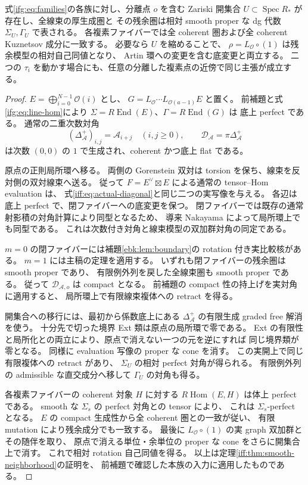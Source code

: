 \begin{theorem}
\label{ifg:thm:smooth-neighborhood}
式\eqref{ifg:eq:families}の各族に対し、分離点 $o$ を含む Zariski 開集合
$U\subset\operatorname{Spec}R_*$ が存在し、全線束の厚生成圏と
その残余圏は相対 smooth proper な dg 代数
$\Sigma_U,\Gamma_U$ で表される。
各複素ファイバーでは全 coherent 圏および全 coherent Kuznetsov 成分に一致する。
必要なら $U$ を縮めることで、
$\rho=L_{\mathcal O}\circ(1)$ は残余模型の相対自己同値となり、
Artin 環への変更を含む底変更と両立する。
二つの $\tau_i$ を動かす場合にも、任意の分離した複素点の近傍で同じ主張が成立する。
\end{theorem}

\begin{proof}
$E=\bigoplus_{i=0}^{N-1}\mathcal O(i)$ とし、
$G=L_{\mathcal O}\cdots L_{\mathcal O(a-1)}E$ と置く。
前補題と式\eqref{ifg:eq:line-hom}により
$\Sigma=R\operatorname{End}(E)$、$\Gamma=R\operatorname{End}(G)$ は
底上 perfect である。
通常の二重次数対角
\[
 (\Delta_{\mathcal A}^{+})_{i,j}=\mathcal A_{i+j}\quad(i,j\ge0),
 \qquad \mathcal D_{\mathcal A}=\pi\Delta_{\mathcal A}^{+}
\]
は次数 $(0,0)$ の $1$ で生成され、coherent かつ底上 flat である。

原点の正則局所環へ移る。
両側の Gorenstein 双対は torsion を保ち、線束を反対側の双対線束へ送る。
従って
$F=E^\vee\boxtimes E$ による通常の tensor--Hom evaluation は、
式\eqref{iff:eq:actual-diagonal}と同じ二つの実写像を与える。
各辺は底上 perfect で、閉ファイバーへの底変更を保つ。
閉ファイバーでは既存の通常射影積の対角計算により同型となるため、
導来 Nakayama によって局所環上でも同型である。
これは次数付き対角と線束模型の双加群対角の同定である。

$m=0$ の閉ファイバーには補題\ref{ebk:lem:boundary}の
rotation 付き実比較核がある。
$m=1$ には主稿の定理を適用する。
いずれも閉ファイバーの残余圏は smooth proper であり、
有限例外列を戻した全線束圏も smooth proper である。
従って $\mathcal D_{\mathcal A,o}$ は compact となる。
前補題の compact 性の持上げを実対角に適用すると、
局所環上で有限線束複体への retract を得る。

開集合への移行には、最初から係数底上にある
$\Delta_{\mathcal A}^{+}$ の有限生成 graded free 解消を使う。
十分先で切った境界 Ext 類は原点の局所環で零である。
Ext の有限性と局所化との両立により、原点で消えない一つの元を逆にすれば
同じ境界類が零となる。
同様に evaluation 写像の proper な cone を消す。
この実開上で同じ有限複体への retract があり、
$\Sigma_U$ の相対 perfect 対角が得られる。
有限例外列の admissible な直交成分へ移して $\Gamma_U$ の対角も得る。

各複素ファイバーの coherent 対象 $H$ に対する
$R\operatorname{Hom}(E,H)$ は体上 perfect である。
smooth な $\Sigma_s$ の perfect 対角との tensor により、
これは $\Sigma_s$-perfect となる。
$E$ の compact 生成性から全 coherent 圏との一致が従い、
有限 mutation により残余成分でも一致する。
最後に $L_{\mathcal O}\circ(1)$ の実 graph 双加群とその随伴を取り、
原点で消える単位・余単位の proper な cone をさらに開集合上で消す。
これで相対 rotation 自己同値を得る。
以上は定理\ref{iff:thm:smooth-neighborhood}の証明を、
前補題で確認した本族の入力に適用したものである。
\end{proof}

